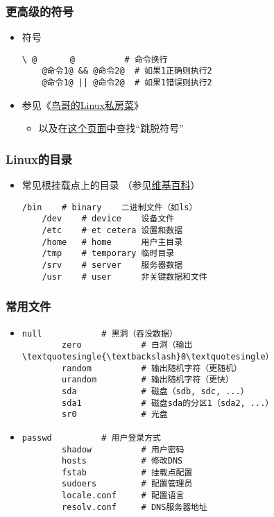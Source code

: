 \begin{frame} [fragile]
	\frametitle{更高级的符号}
	\linespread{1.5}
	\begin{itemize}
	\item 符号
	\begin{lstlisting}[style=bashstyle, gobble=4, texcl, escapechar=@]
	\ @　　　　@		  # 命令换行
	@命令1@ && @命令2@	# 如果1正确则执行2
	@命令1@ || @命令2@	# 如果1错误则执行2
	\end{lstlisting}
	\item 参见《\href{http://cn.linux.vbird.org/linux\_basic/0320bash\_5.php}
					{鸟哥的Linux私房菜}》
		\begin{itemize}
		\item 以及在\href{http://cn.linux.vbird.org/linux\_basic/0320bash\_2.php}
						{这个页面}中查找``跳脱符号''
		\end{itemize}
	\end{itemize}
\end{frame}

\begin{frame} [fragile]
	\frametitle{Linux的目录}
	\linespread{1.25}
	\begin{itemize}
	\item 常见根挂载点上的目录
		（参见\href{https://en.wikipedia.org/wiki/Unix\_filesystem}{维基百科}）
	\begin{lstlisting}[style=bashstyle, gobble=4, texcl,
						escapebegin=\obeyspaces]
	/bin	# binary    二进制文件（如ls）
	/dev	# device    设备文件
	/etc	# et cetera 设置和数据
	/home	# home      用户主目录
	/tmp	# temporary 临时目录
	/srv	# server    服务器数据
	/usr	# user      非关键数据和文件
	\end{lstlisting}
	\end{itemize}
\end{frame}

\begin{frame} [fragile]
	\frametitle{常用文件}
	\small
	\begin{itemize}
	\item {}
		\begin{lstlisting}[style=bashstyle, gobble=8, texcl]
		null			# 黑洞（吞没数据）
		zero			# 白洞（输出\textquotesingle{\textbackslash}0\textquotesingle）
		random			# 输出随机字符（更随机）
		urandom			# 输出随机字符（更快）
		sda				# 磁盘（sdb, sdc, ...）
		sda1			# 磁盘sda的分区1（sda2, ...）
		sr0				# 光盘
		\end{lstlisting}
	\item {}
		\begin{lstlisting}[style=bashstyle, gobble=8, texcl]
		passwd			# 用户登录方式
		shadow			# 用户密码
		hosts			# 修改DNS
		fstab			# 挂载点配置
		sudoers			# 配置管理员
		locale.conf		# 配置语言
		resolv.conf		# DNS服务器地址
		\end{lstlisting}
	\end{itemize}
\end{frame}

